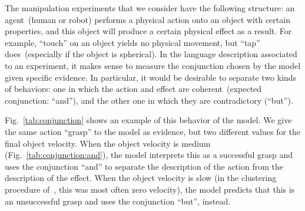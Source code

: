 The manipulation experiments that we consider have the following structure: an agent~(human or robot) performs a physical action onto an object with certain properties, and this object will produce a certain physical effect as a result.
For example, ``touch'' on an object yields no physical movement, but ``tap'' does~(especially if the object is spherical).
In the language description associated to an experiment, it makes sense to measure the conjunction chosen by the model given specific evidence.
In particular, it would be desirable to separate two kinds of behaviors: one in which the action and effect are coherent~(expected conjunction: ``and''), and the other one in which they are contradictory (``but'').

Fig.~\ref{tab:conjunction} shows an example of this behavior of the model.
We give the same action ``grasp'' to the model as evidence, but two different values for the final object velocity.
When the object velocity is medium (Fig.~\ref{tab:conjunction:and}), the model interprets this as a successful grasp and uses the conjunction ``and'' to separate the description of the action from the description of the effect.
When the object velocity is slow (in the clustering procedure of~\cite{salvi:2012:smcb}, this was most often zero velocity), the model predicts that this is an unsuccessful grasp and uses the conjunction ``but'', instead.


